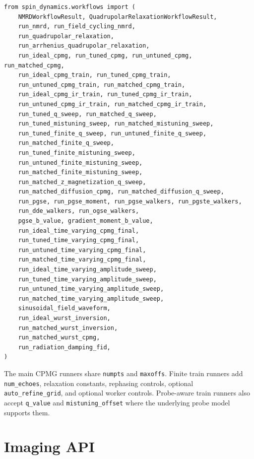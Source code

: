 \documentclass[11pt,oneside]{report}
\newcommand{\code}[1]{\texttt{#1}}
\begin{document}
\begin{lstlisting}
from spin_dynamics.workflows import (
    NMRDWorkflowResult, QuadrupolarRelaxationWorkflowResult,
    run_nmrd, run_field_cycling_nmrd,
    run_quadrupolar_relaxation,
    run_arrhenius_quadrupolar_relaxation,
    run_ideal_cpmg, run_tuned_cpmg, run_untuned_cpmg, run_matched_cpmg,
    run_ideal_cpmg_train, run_tuned_cpmg_train,
    run_untuned_cpmg_train, run_matched_cpmg_train,
    run_ideal_cpmg_ir_train, run_tuned_cpmg_ir_train,
    run_untuned_cpmg_ir_train, run_matched_cpmg_ir_train,
    run_tuned_q_sweep, run_matched_q_sweep,
    run_tuned_mistuning_sweep, run_matched_mistuning_sweep,
    run_tuned_finite_q_sweep, run_untuned_finite_q_sweep,
    run_matched_finite_q_sweep,
    run_tuned_finite_mistuning_sweep,
    run_untuned_finite_mistuning_sweep,
    run_matched_finite_mistuning_sweep,
    run_matched_z_magnetization_q_sweep,
    run_matched_diffusion_cpmg, run_matched_diffusion_q_sweep,
    run_pgse, run_pgse_moment, run_pgse_walkers, run_pgste_walkers,
    run_dde_walkers, run_ogse_walkers,
    pgse_b_value, gradient_moment_b_value,
    run_ideal_time_varying_cpmg_final,
    run_tuned_time_varying_cpmg_final,
    run_untuned_time_varying_cpmg_final,
    run_matched_time_varying_cpmg_final,
    run_ideal_time_varying_amplitude_sweep,
    run_tuned_time_varying_amplitude_sweep,
    run_untuned_time_varying_amplitude_sweep,
    run_matched_time_varying_amplitude_sweep,
    sinusoidal_field_waveform,
    run_ideal_wurst_inversion,
    run_matched_wurst_inversion,
    run_matched_wurst_cpmg,
    run_radiation_damping_fid,
)
\end{lstlisting}

The main CPMG runners share \code{numpts} and \code{maxoffs}. Finite train
runners add \code{num\_echoes}, relaxation constants, rephasing controls,
optional \code{auto\_refine\_grid}, and optional worker controls. Probe-aware
train runners also accept \code{q\_value} and \code{mistuning\_offset} where the
underlying probe model supports them.

\section{Imaging API}
\end{document}
